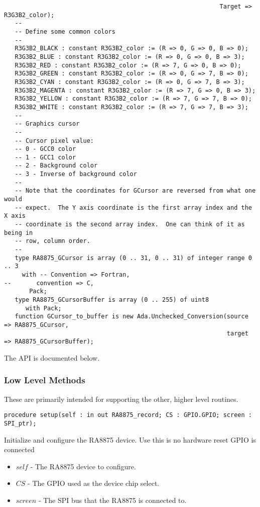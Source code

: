 \documentclass[10pt, openany]{book}
\begin{document}
\begin{lstlisting}
                                                            Target => R3G3B2_color);
   --
   -- Define some common colors
   --
   R3G3B2_BLACK : constant R3G3B2_color := (R => 0, G => 0, B => 0);
   R3G3B2_BLUE : constant R3G3B2_color := (R => 0, G => 0, B => 3);
   R3G3B2_RED : constant R3G3B2_color := (R => 7, G => 0, B => 0);
   R3G3B2_GREEN : constant R3G3B2_color := (R => 0, G => 7, B => 0);
   R3G3B2_CYAN : constant R3G3B2_color := (R => 0, G => 7, B => 3);
   R3G3B2_MAGENTA : constant R3G3B2_color := (R => 7, G => 0, B => 3);
   R3G3B2_YELLOW : constant R3G3B2_color := (R => 7, G => 7, B => 0);
   R3G3B2_WHITE : constant R3G3B2_color := (R => 7, G => 7, B => 3);
   --
   -- Graphics cursor
   --
   -- Cursor pixel value:
   -- 0 - GCC0 color
   -- 1 - GCC1 color
   -- 2 - Background color
   -- 3 - Inverse of background color
   --
   -- Note that the coordinates for GCursor are reversed from what one would
   -- expect.  The Y axis coordinate is the first array index and the X axis
   -- coordinate is the second array index.  One can think of it as being in
   -- row, column order.
   --
   type RA8875_GCursor is array (0 .. 31, 0 .. 31) of integer range 0 .. 3
     with -- Convention => Fortran,
--       convention => C,
       Pack;
   type RA8875_GCursorBuffer is array (0 .. 255) of uint8
      with Pack;
   function GCursor_to_buffer is new Ada.Unchecked_Conversion(source => RA8875_GCursor,
                                                              target => RA8875_GCursorBuffer);
\end{lstlisting}

The API is documented below.

\subsubsection{Low Level Methods}
These are primarily intended for supporting the other, higher level routines.
\begin{lstlisting}
procedure setup(self : in out RA8875_record; CS : GPIO.GPIO; screen : SPI_ptr);
\end{lstlisting}
Initialize and configure the RA8875 device.  Use this is no hardware reset GPIO is connected
\begin{itemize}
  \item $self$ - The RA8875 device to configure.
  \item $CS$ - The GPIO used as the device chip select.
  \item $screen$ - The SPI bus that the RA8875 is connected to.
\end{itemize}
\end{document}
